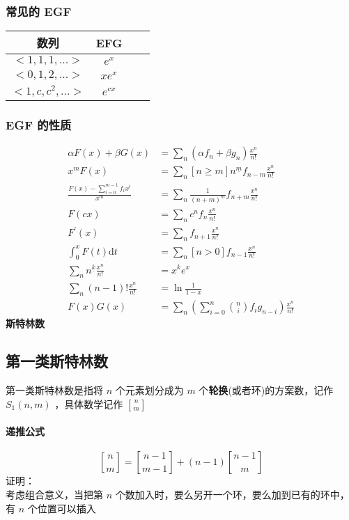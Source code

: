 	\subsubsection{常见的 EGF}
	\begin{center}
		\renewcommand\arraystretch{2.3}
		\begin{tabular}{ccc|c}
			\hline
			\hline
			数列&EFG\\
			\hline
			$<1,1,1,...>$&$e^x$\\
			$<0,1,2,...>$&$xe^x$\\
			$<1,c,c^2,...>$&$e^{cx}$\\
			\hline
			\hline
		\end{tabular}
	\end{center}
	\subsubsection{ EGF 的性质}	
	$$
	\begin{aligned}
	\alpha F(x)+\beta G(x)&=\sum_n(\alpha f_n+\beta g_n)\frac{x^n}{n!}\\
	x^mF(x)&=\sum_n[n\geq m]n^{\underline m}f_{n-m}\frac{x^n}{n!}\\
	\frac{F(x)-\sum_{i=0}^{m-1}f_ix^i}{x^m}&=\sum_n\frac1{(n+m)^{\underline m}}f_{n+m}\frac{x^n}{n!}\\
	F(cx)&=\sum_nc^nf_n\frac{x^n}{n!}\\
	F^\prime(x)&=\sum_nf_{n+1}\frac{x^n}{n!}\\
	\int_0^xF(t)\mathrm{d}t&=\sum_n[n>0]f_{n-1}\frac{x^n}{n!}\\
	\sum_{n}n^{\underline k}\frac{x^n}{n!}&=x^ke^x \\
	\sum_{n}(n-1)!\frac{x^n}{n!}&=\ln \frac{1}{1-x} \\
	F(x)G(x)&=\sum_n\left(\sum_{i=0}^n\binom nif_ig_{n-i}\right)\frac{x^n}{n!}
	\end{aligned}
	$$
	\newpage
	\textbf{\large 斯特林数}
	\subsection{第一类斯特林数}
	第一类斯特林数是指将 $n$ 个元素划分成为 $m$ 个\textbf{轮换}(或者环)的方案数，记作 $S_1(n,m)$ ，具体数学记作 $n\brack m$
	\paragraph{递推公式}
	$$
	{n\brack m}={n-1\brack m-1}+(n-1){n-1\brack m}
	$$
	证明：\\
	考虑组合意义，当把第 $n$ 个数加入时，要么另开一个环，要么加到已有的环中，有 $n$ 个位置可以插入\\
